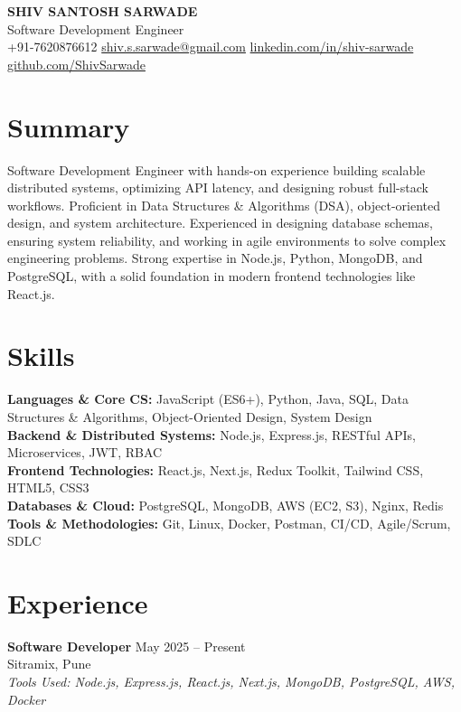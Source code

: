 \documentclass[a4paper,10pt]{article}
\begin{document}
\pagestyle{empty}

\begin{center}
    {\LARGE \textbf{SHIV SANTOSH SARWADE}}\\
    Software Development Engineer\\[4pt]
    +91-7620876612 \quad
    \href{mailto:shiv.s.sarwade@gmail.com}{shiv.s.sarwade@gmail.com} \quad
    \href{https://linkedin.com/in/shiv-sarwade}{linkedin.com/in/shiv-sarwade} \quad
    \href{https://github.com/ShivSarwade}{github.com/ShivSarwade}
\end{center}

\section*{Summary}

Software Development Engineer with hands-on experience building scalable distributed systems, optimizing API latency, and designing robust full-stack workflows. Proficient in Data Structures \& Algorithms (DSA), object-oriented design, and system architecture. Experienced in designing database schemas, ensuring system reliability, and working in agile environments to solve complex engineering problems. Strong expertise in Node.js, Python, MongoDB, and PostgreSQL, with a solid foundation in modern frontend technologies like React.js.

\section*{Skills}

\textbf{Languages \& Core CS:} JavaScript (ES6+), Python, Java, SQL, Data Structures \& Algorithms, Object-Oriented Design, System Design\\
\textbf{Backend \& Distributed Systems:} Node.js, Express.js, RESTful APIs, Microservices, JWT, RBAC\\
\textbf{Frontend Technologies:} React.js, Next.js, Redux Toolkit, Tailwind CSS, HTML5, CSS3\\
\textbf{Databases \& Cloud:} PostgreSQL, MongoDB, AWS (EC2, S3), Nginx, Redis\\
\textbf{Tools \& Methodologies:} Git, Linux, Docker, Postman, CI/CD, Agile/Scrum, SDLC

\section*{Experience}

\textbf{Software Developer} \hfill May 2025 -- Present\\
Sitramix, Pune\\
\textit{Tools Used: Node.js, Express.js, React.js, Next.js, MongoDB, PostgreSQL, AWS, Docker}
\end{document}
